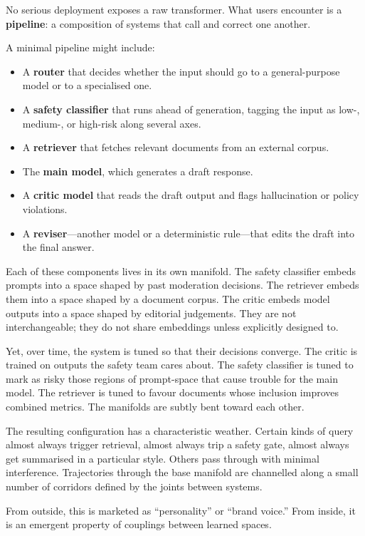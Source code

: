 \documentclass[12pt,a4paper]{article}
\begin{document}
No serious deployment exposes a raw transformer. What users encounter is a \textbf{pipeline}: a composition of systems that call and correct one another.

A minimal pipeline might include:

\begin{itemize}
  \item A \textbf{router} that decides whether the input should go to a general-purpose model or to a specialised one.
  \item A \textbf{safety classifier} that runs ahead of generation, tagging the input as low-, medium-, or high-risk along several axes.
  \item A \textbf{retriever} that fetches relevant documents from an external corpus.
  \item The \textbf{main model}, which generates a draft response.
  \item A \textbf{critic model} that reads the draft output and flags hallucination or policy violations.
  \item A \textbf{reviser}---another model or a deterministic rule---that edits the draft into the final answer.
\end{itemize}

Each of these components lives in its own manifold. The safety classifier embeds prompts into a space shaped by past moderation decisions. The retriever embeds them into a space shaped by a document corpus. The critic embeds model outputs into a space shaped by editorial judgements. They are not interchangeable; they do not share embeddings unless explicitly designed to.

Yet, over time, the system is tuned so that their decisions converge. The critic is trained on outputs the safety team cares about. The safety classifier is tuned to mark as risky those regions of prompt-space that cause trouble for the main model. The retriever is tuned to favour documents whose inclusion improves combined metrics. The manifolds are subtly bent toward each other.

The resulting configuration has a characteristic weather. Certain kinds of query almost always trigger retrieval, almost always trip a safety gate, almost always get summarised in a particular style. Others pass through with minimal interference. Trajectories through the base manifold are channelled along a small number of corridors defined by the joints between systems.

From outside, this is marketed as ``personality'' or ``brand voice.'' From inside, it is an emergent property of couplings between learned spaces.
\end{document}
